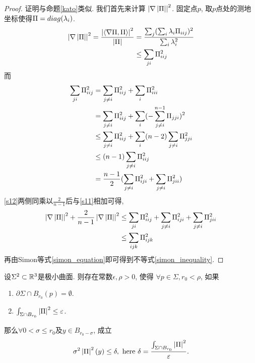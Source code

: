 \begin{proof}
    证明与命题\eqref{kato}类似. 我们首先来计算 $\left | \nabla \left | {\Pi} \right | \right |^2$. 固定点$p$, 取$p$点处的测地坐标使得${\Pi}=diag(\lambda_i)$.
    \begin{equation} \label{s11}
        \begin{split}
            \left | \nabla \left | {\Pi} \right | \right |^2 = \frac{\left | {\left < \nabla {\Pi}, {\Pi} \right >} \right |^2}{\left | {\Pi} \right |} &= \frac{\sum_j(\sum_i\lambda_i{\Pi}_{iij})^2}{\sum_i\lambda_i^2} \\
            &\le \sum_{ji}{\Pi}_{iij}^2
        \end{split}
    \end{equation}
    而
    \begin{equation} \label{s12}
        \begin{split}
            \sum_{ji}{\Pi}_{iij}^2 &= \sum_{j\ne i}{\Pi}_{iij}^2+ \sum_{i}{\Pi}_{iii}^2 \\
            &= \sum_{j\ne i}{\Pi}_{iij}^2+ \sum_{i}(-\sum^{n-1}_{j \ne i}{\Pi}_{jji})^2\\
            &\le \sum_{j\ne i}{\Pi}_{iij}^2+ \sum_{i}(n-2)\sum_{j\ne i}{\Pi}_{jji}^2\\
            &\le (n-1)\sum_{j\ne i}{\Pi}_{iij}^2\\
            &= \frac{n-1}{2}(\sum_{j\ne i}{\Pi}_{iji}^2 +\sum_{j\ne i}{\Pi}_{jii}^2)
        \end{split}
    \end{equation}
    \eqref{s12}两侧同乘以$\frac{2}{n-1}$后与\eqref{s11}相加可得,
    \begin{equation}
        \begin{split}
            \left | \nabla \left | {\Pi} \right | \right |^2+\frac{2}{n-1} \left | \nabla \left | {\Pi} \right | \right |^2 &\le \sum_{ji}{\Pi}_{iij}^2 + \sum_{j\ne i}{\Pi}_{iji}^2 +\sum_{j\ne i}{\Pi}_{jii}^2 \\
            &\le \sum_{ijk}{\Pi}^2_{ijk}
        \end{split}
    \end{equation}
    再由Simon等式\eqref{simon_equation}即可得到不等式\eqref{simon_inequality}.
\end{proof}
\begin{theorem}\label{choi_schoen}
    设$\Sigma^2 \subset \mathbb{R}^3$是极小曲面.  则存在常数$\epsilon, \rho>0$, 使得 $\forall p \in \Sigma, r_0 < \rho$, 如果
    \begin{enumerate}
        \item $\partial \Sigma \cap B_{r_0}(p)=\emptyset$.
        \item $\int_{\Sigma \cap B_{r_0}} \left | {\Pi} \right |^2\le \varepsilon$.
    \end{enumerate}
    那么$\forall  0 < \sigma \le r_0$及$y \in B_{r_0-\sigma}$, 成立
    \begin{equation}
        \sigma^2 \left | {\Pi} \right |^2(y) \le \delta, \text{ here }\delta= \frac{\int_{\Sigma \cap B_{r_0}}\left | {\Pi} \right |^2}{\varepsilon}.
    \end{equation}
\end{theorem}
